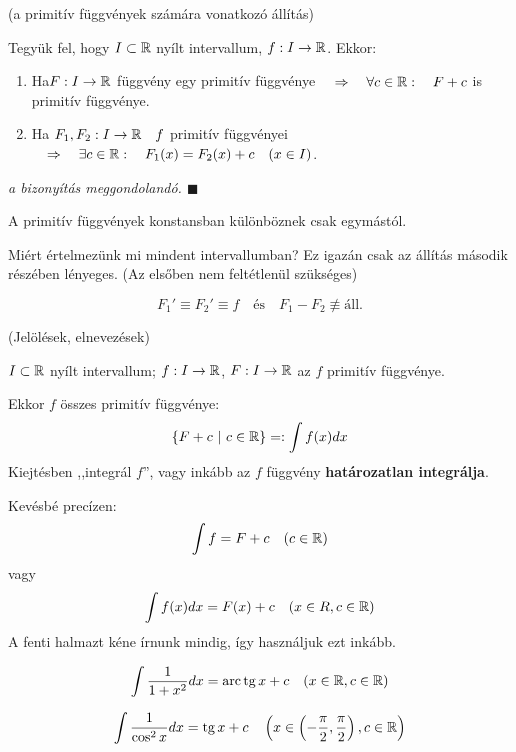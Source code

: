 \documentclass[a4paper,11.5pt]{article}
\DeclareMathOperator{\tg}{tg}
\DeclareMathOperator{\arc}{arc}
\begin{document}
	\begin{theorem}
		(a primitív függvények számára vonatkozó állítás)
		
		Tegyük fel, hogy $I\subset\mathbb{R}$ nyílt intervallum, $f:I\to\mathbb{R}$. Ekkor:
		\begin{enumerate}
			\item Ha\quad  $F:I\to\mathbb{R}$ \quad függvény egy primitív függvénye $\quad \Rightarrow\quad \forall c\in\mathbb{R}:\quad F+c$ \quad is primitív függvénye.
			\item Ha $F_1, F_2:I\to\mathbb{R}\quad f$ primitív függvényei$\quad \Rightarrow\quad \exists c\in\mathbb{R}:\quad F_1(x)=F_2(x)+c\quad (x\in I)$.
			
		\end{enumerate}
		\textit{a bizonyítás meggondolandó. $\blacksquare$}
	\end{theorem}
	\begin{note}
		A primitív függvények konstansban különböznek csak egymástól.
	\end{note}
	\begin{note}
		Miért értelmezünk mi mindent intervallumban? Ez igazán csak az állítás második részében lényeges. (Az elsőben nem feltétlenül szükséges)
		
		\begin{figure}[!h]
			\centering
			\caption{}\label{}
		\end{figure}
		\[ F_1'\equiv F_2'\equiv f\quad \text{és}\quad F_1-F_2\not\equiv \text{áll.} \]
	\end{note}
	\begin{definition}
		(Jelölések, elnevezések)
		
		$I\subset\mathbb{R}$ nyílt intervallum; \quad $f:I\to\mathbb{R}$, $F:I\to\mathbb{R}$ az $f$ primitív függvénye.
		
		\medskip
		Ekkor $f$ összes primitív függvénye:
		\[ \{ F+c\ | \ c\in\R \}=:\int f(x)dx \]
		Kiejtésben ,,integrál $f$'', vagy inkább az $f$ függvény \textbf{határozatlan integrálja}.
		
		\medskip
		Kevésbé precízen:
		\[ \int f=F+c\quad (c\in\mathbb{R}) \]
		vagy
		\[  \int f(x)dx=F(x)+c\quad (x\in R, c\in\mathbb{R}) \]
		A fenti halmazt kéne írnunk mindig, így használjuk ezt inkább.
	\end{definition}
	\begin{example}
		\[ \int\frac{1}{1+x^2}dx=\arc\tg x + c\quad (x\in\R,c\in\R) \]
	\end{example}
	\begin{example}
		\[ \int\frac{1}{\cos^2x}dx=\tg x + c\quad \left(x\in\left(-\frac{\pi}{2},\frac{\pi}{2}\right),c\in\R\right) \]
	\end{example}
\end{document}
